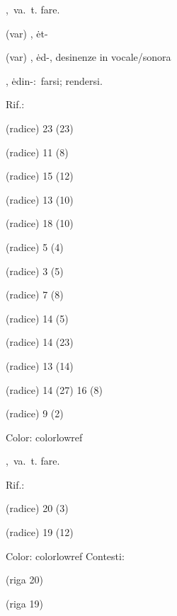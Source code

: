 ,\ va.\ t.
fare.
\begin{subvocedue}
\item[(var)] , {\sf ėt-}\item[(var)] , {\sf ėd-}, desinenze in vocale/sonora\item[\subglossariobullet] , {\sf ėdin-}:\ farsi; rendersi.
\begin{subvocedue}
\item[Rif.:] 
\end{subvocedue}
\item[(radice)]   23 (23)
\item[(radice)]   11 (8)
\item[(radice)]   15 (12)
\item[(radice)]   13 (10)
\item[(radice)]   18 (10)
\item[(radice)]   5 (4)
\item[(radice)]   3 (5)
\item[(radice)]   7 (8)
\item[(radice)]   14 (5)
\item[(radice)]   14 (23)
\item[(radice)]   13 (14)
\item[(radice)]   14 (27) 16 (8)
\item[(radice)]   9 (2)
\end{subvocedue}
Color: colorlowref

,\ va.\ t.
fare.
\begin{subvocedue}
\item[Rif.:] 
\end{subvocedue}
\begin{subvocedue}
\item[(radice)]   20 (3)
\item[(radice)]   19 (12)
\end{subvocedue}
Color: colorlowref
Contesti:
\begin{subvocedue}
\item[(riga 20)] 
\item[(riga 19)] 
\end{subvocedue}

